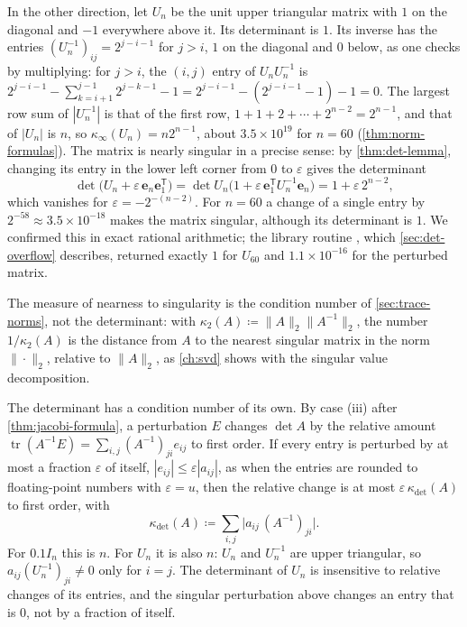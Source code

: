 In the other direction, let $U_n$ be the unit upper triangular matrix with $1$ on the diagonal and $-1$ everywhere above it. Its determinant is $1$. Its inverse has the entries $(U_n^{-1})_{ij}=2^{j-i-1}$ for $j>i$, $1$ on the diagonal and $0$ below, as one checks by multiplying: for $j>i$, the $(i,j)$ entry of $U_nU_n^{-1}$ is $2^{j-i-1}-\sum_{k=i+1}^{j-1}2^{j-k-1}-1=2^{j-i-1}-(2^{j-i-1}-1)-1=0$. The largest row sum of $|U_n^{-1}|$ is that of the first row, $1+1+2+\cdots+2^{n-2}=2^{n-1}$, and that of $|U_n|$ is $n$, so $\kappa_\infty(U_n)=n2^{n-1}$, about $3.5\times10^{19}$ for $n=60$ (\cref{thm:norm-formulas}). The matrix is nearly singular in a precise sense: by \cref{thm:det-lemma}, changing its entry in the lower left corner from $0$ to $\varepsilon$ gives the determinant
\[
\det\bigl(U_n+\varepsilon\,\mathbf e_n\mathbf e_1^{\mathsf T}\bigr)=\det U_n\bigl(1+\varepsilon\,\mathbf e_1^{\mathsf T}U_n^{-1}\mathbf e_n\bigr)=1+\varepsilon\,2^{n-2},
\]
which vanishes for $\varepsilon=-2^{-(n-2)}$. For $n=60$ a change of a single entry by $2^{-58}\approx3.5\times10^{-18}$ makes the matrix singular, although its determinant is $1$. We confirmed this in exact rational arithmetic; the library routine , which \cref{sec:det-overflow} describes, returned exactly $1$ for $U_{60}$ and $1.1\times10^{-16}$ for the perturbed matrix.

The measure of nearness to singularity is the condition number of \cref{sec:trace-norms}, not the determinant: with $\kappa_2(A)\coloneqq\|A\|_2\|A^{-1}\|_2$, the number $1/\kappa_2(A)$ is the distance from $A$ to the nearest singular matrix in the norm $\|\cdot\|_2$, relative to $\|A\|_2$, as \cref{ch:svd} shows with the singular value decomposition.

The determinant has a condition number of its own. By case (iii) after \cref{thm:jacobi-formula}, a perturbation $E$ changes $\det A$ by the relative amount $\operatorname{tr}(A^{-1}E)=\sum_{i,j}(A^{-1})_{ji}e_{ij}$ to first order. If every entry is perturbed by at most a fraction $\varepsilon$ of itself, $|e_{ij}|\le\varepsilon|a_{ij}|$, as when the entries are rounded to floating-point numbers with $\varepsilon=u$, then the relative change is at most $\varepsilon\,\kappa_{\det}(A)$ to first order, with
\[
\kappa_{\det}(A)\coloneqq\sum_{i,j}\bigl|a_{ij}\,(A^{-1})_{ji}\bigr| .
\]
For $0.1I_n$ this is $n$. For $U_n$ it is also $n$: $U_n$ and $U_n^{-1}$ are upper triangular, so $a_{ij}(U_n^{-1})_{ji}\ne0$ only for $i=j$. The determinant of $U_n$ is insensitive to relative changes of its entries, and the singular perturbation above changes an entry that is $0$, not by a fraction of itself.

